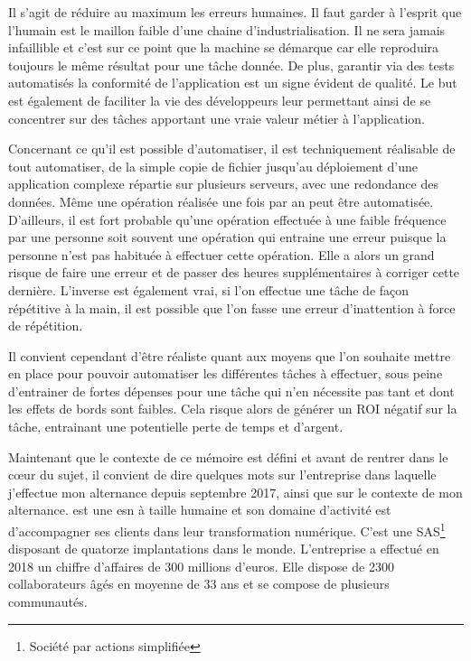 Il s'agit de réduire au maximum les erreurs humaines. Il faut garder à l'esprit que l'humain est le maillon faible d'une chaine d'industrialisation. Il ne sera jamais infaillible et c'est sur ce point que la machine se démarque car elle reproduira toujours le même résultat pour une tâche donnée. De plus, garantir via des tests automatisés la conformité de l'application est un signe évident de qualité. Le but est également de faciliter la vie des développeurs leur permettant ainsi de se concentrer sur des tâches apportant une vraie valeur métier à l'application.

Concernant ce qu'il est possible d'automatiser, il est techniquement réalisable de tout automatiser, de la simple copie de fichier jusqu'au déploiement d'une application complexe répartie sur plusieurs serveurs, avec une redondance des données. Même une opération réalisée une fois par an peut être automatisée. D'ailleurs, il est fort probable qu'une opération effectuée à une faible fréquence par une personne soit souvent une opération qui entraine une erreur puisque la personne n'est pas habituée à effectuer cette opération. Elle a alors un grand risque de faire une erreur et de passer des heures supplémentaires à corriger cette dernière. \newline L'inverse est également vrai, si l'on effectue une tâche de façon répétitive à la main, il est possible que l'on fasse une erreur d'inattention à force de répétition. 

Il convient cependant d'être réaliste quant aux moyens que l'on souhaite mettre en place pour pouvoir automatiser les différentes tâches à effectuer, sous peine d'entrainer de fortes dépenses pour une tâche qui n'en nécessite pas tant et dont les effets de bords sont faibles. Cela risque alors de générer un \gls{ROI} négatif sur la tâche, entrainant une potentielle perte de temps et d'argent.

Maintenant que le contexte de ce mémoire est défini et avant de rentrer dans le cœur du sujet, il convient de dire quelques mots sur l'entreprise dans laquelle j'effectue mon alternance depuis septembre 2017, \onepoint{} ainsi que sur le contexte de mon alternance. \xmakefirstuc{\onepoint{}} est une \gls{esn} à taille humaine et son domaine d'activité est d'accompagner ses clients dans leur transformation numérique. C'est une SAS\footnote{Société par actions simplifiée} disposant de quatorze implantations dans le monde. L'entreprise a effectué en 2018 un chiffre d'affaires de 300 millions d'euros. Elle dispose de 2300 collaborateurs âgés en moyenne de 33 ans et se compose de plusieurs communautés.

